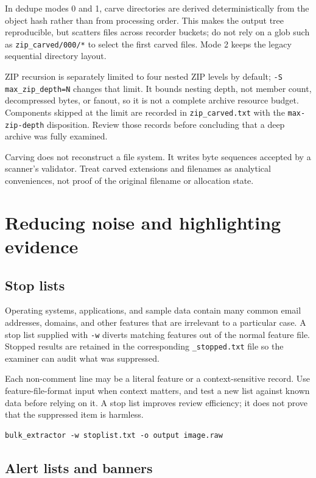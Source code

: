 \documentclass[11pt]{article}
\newcommand{\code}[1]{\texttt{#1}}
\begin{document}
In dedupe modes 0 and 1, carve directories are derived deterministically from
the object hash rather than from processing order. This makes the output tree
reproducible, but scatters files across recorder buckets; do not rely on a glob
such as \code{zip\_carved/000/*} to select the first carved files. Mode 2 keeps
the legacy sequential directory layout.

ZIP recursion is separately limited to four nested ZIP levels by default;
\code{-S max\_zip\_depth=N} changes that limit. It bounds nesting depth, not
member count, decompressed bytes, or fanout, so it is not a complete archive
resource budget. Components skipped at the limit are recorded in
\code{zip\_carved.txt} with the \code{max-zip-depth} disposition. Review those
records before concluding that a deep archive was fully examined.

Carving does not reconstruct a file system. It writes byte sequences accepted
by a scanner's validator. Treat carved extensions and filenames as analytical
conveniences, not proof of the original filename or allocation state.

\section{Reducing noise and highlighting evidence}

\subsection{Stop lists}

Operating systems, applications, and sample data contain many common email
addresses, domains, and other features that are irrelevant to a particular
case. A stop list supplied with \code{-w} diverts matching features out of the
normal feature file. Stopped results are retained in the corresponding
\code{\_stopped.txt} file so the examiner can audit what was suppressed.

Each non-comment line may be a literal feature or a context-sensitive record.
Use feature-file-format input when context matters, and test a new list against
known data before relying on it. A stop list improves review efficiency; it
does not prove that the suppressed item is harmless.

\begin{Verbatim}
bulk_extractor -w stoplist.txt -o output image.raw
\end{Verbatim}

\subsection{Alert lists and banners}
\end{document}
